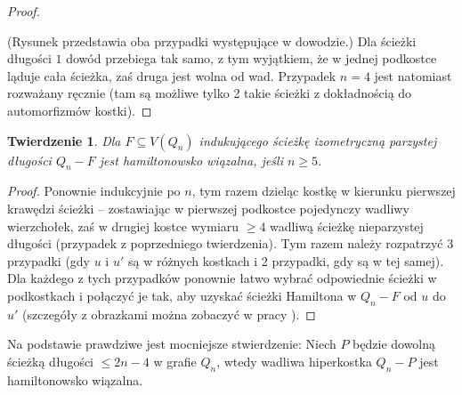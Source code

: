 \documentclass{pracamgr}
\newtheorem{theorem}{Twierdzenie}[chapter]
\begin{document}
\begin{proof}
\begin{center}
     \end{center}
     (Rysunek przedstawia oba przypadki występujące w dowodzie.)\newline
     Dla ścieżki długości $1$ dowód przebiega tak samo, z tym wyjątkiem, że w jednej podkostce ląduje cała ścieżka, zaś druga jest wolna od wad.
     Przypadek $n=4$ jest natomiast rozważany ręcznie
     (tam są możliwe tylko 2 takie ścieżki z dokładnością do automorfizmów kostki).
    \end{proof}
    \begin{theorem}\label{hamilton - sciezka, parz}
     Dla $F\subseteq V(Q_n)$ indukującego ścieżkę izometryczną parzystej długości $Q_n-F$ jest hamiltonowsko wiązalna, jeśli $n\ge5$.
    \end{theorem}
    \begin{proof}
     Ponownie indukcyjnie po $n$, tym razem dzieląc kostkę w kierunku pierwszej krawędzi ścieżki -- zostawiając w pierwszej podkostce pojedynczy wadliwy wierzchołek,
     zaś w drugiej kostce wymiaru $\ge4$ wadliwą ścieżkę nieparzystej długości (przypadek z poprzedniego twierdzenia).
     Tym razem należy rozpatrzyć 3 przypadki (gdy $u$ i $u'$ są w różnych kostkach i 2 przypadki, gdy są w tej samej).
     Dla każdego z tych przypadków ponownie łatwo wybrać odpowiednie ścieżki w podkostkach i połączyć je tak, aby uzyskać ścieżki Hamiltona w
     $Q_n-F$ od $u$ do $u'$ (szczegóły z obrazkami można zobaczyć w pracy \cite{Pegr}).
    \end{proof}
     Na podstawie \cite{SCJY} prawdziwe jest mocniejsze stwierdzenie:\newline
     Niech $P$ będzie dowolną ścieżką długości $\le 2n-4$ w grafie $Q_n$, wtedy wadliwa hiperkostka  $Q_n-P$ jest hamiltonowsko wiązalna.
\end{document}
